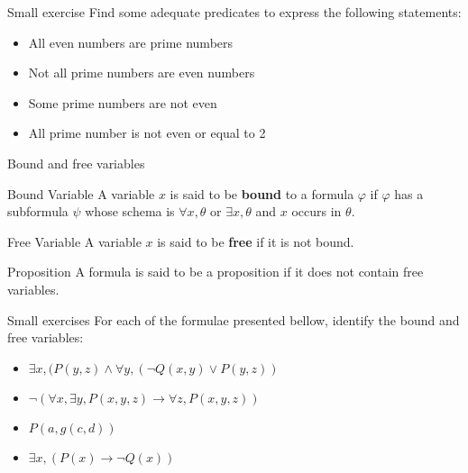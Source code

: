 \documentclass[aspectratio=169]{beamer}
\begin{document}
\begin{slide}{Small exercise}
Find some adequate predicates to express the following statements:
\begin{itemize}
\item All even numbers are prime numbers\\
\item Not all prime numbers are even numbers\\
\item Some prime numbers are not even\\
\item All prime number is not even or equal to 2\\  
\end{itemize}
\end{slide}

\begin{slide}{Bound and free variables}
  \begin{block}{Bound Variable}
  A variable $x$ is said to be {\bf bound} to a formula $\varphi$ if $\varphi$ has a subformula $\psi$ whose schema is $\forall x, \theta$ or $\exists x, \theta$ and $x$ occurs in $\theta$. 
  \end{block}
  \begin{block}{Free Variable}
  A variable $x$ is said to be {\bf free} if it is not bound.  
  \end{block}
  \begin{block}{Proposition}
  A formula is said to be a proposition if it does not contain free variables.  
  \end{block}
\end{slide}

\begin{slide}{Small exercises}
For each of the formulae presented bellow, identify the bound and free variables:
\begin{itemize}
\item $\exists x, (P(y,z) \land \forall y, (\neg Q(x,y) \lor P(y,z))$  
\item $\neg(\forall x, \exists y, P(x,y,z) \to \forall z, P(x,y,z))$
\item $P(a,g(c,d))$
\item $\exists x, (P(x) \to \neg Q(x))$
\end{itemize}
\end{slide}
\end{document}
